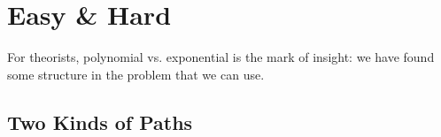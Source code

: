 \documentclass[]{article}
\begin{document}


\section{Easy \& Hard}

\cite[Chapters 1,2,4]{moore2011nature}

For theorists, polynomial vs. exponential is the mark of insight: we have found some structure in the problem that we can use.

\subsection{Two Kinds of Paths}
\end{document}
